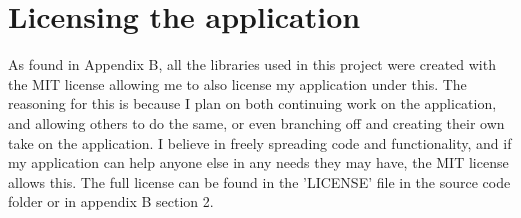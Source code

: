 \section{Licensing the application}

As found in Appendix B, all the libraries used in this project were created with the MIT license allowing me to also license my application under this. The reasoning for this is because I plan on both continuing work on the application, and allowing others to do the same, or even branching off and creating their own take on the application. I believe in freely spreading code and functionality, and if my application can help anyone else in any needs they may have, the MIT license allows this. The full license can be found in the 'LICENSE' file in the source code folder or in appendix B section 2.
